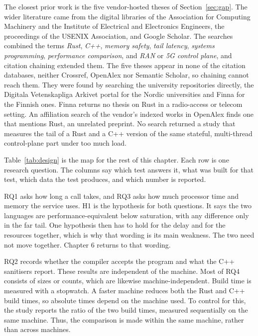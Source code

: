 \documentclass[english,oneside,a4paper,censored,csm,software-track-2020]{HYthesisML}
\begin{document}
The closest prior work is the five vendor-hosted theses of Section~\ref{sec:gap}.
The wider literature came from the digital libraries of the Association for Computing
Machinery and the Institute of Electrical and Electronics Engineers, the proceedings of the
USENIX Association, and Google Scholar. The searches combined the terms \emph{Rust},
\emph{C++}, \emph{memory safety}, \emph{tail latency}, \emph{systems programming},
\emph{performance comparison}, and \emph{RAN} or \emph{5G control plane}, and citation
chaining extended them. The five theses appear in none of the citation databases, neither
Crossref, OpenAlex nor Semantic Scholar, so chaining cannot reach them. They were found by
searching the university repositories directly, the Digitala Vetenskapliga Arkivet portal for
the Nordic universities and Finna for the Finnish ones. Finna returns no thesis on Rust in
a radio-access or telecom setting. An affiliation search of the vendor's indexed works in
OpenAlex finds one that mentions Rust, an unrelated preprint. No search returned a study
that measures the tail of a Rust and a C++ version of the same stateful, multi-thread
control-plane part under too much load.

Table~\ref{tab:design} is the map for the rest of this chapter. Each row is one research question.
The columns say which test answers it, what was built for that test, which data the test
produces, and which number is reported.

RQ1 asks how long a call takes, and RQ3 asks how much processor time and memory
the service uses. H1 is the hypothesis for
both questions. It says the two languages are performance-equivalent below
saturation, with any difference only in the far tail. One hypothesis then has
to hold for the delay and for the resources together, which is why that wording
is its main weakness. The two need not move together. Chapter 6 returns to that wording.

RQ2 records whether the compiler accepts the program and what the C++ sanitisers report. 
These results are independent of the machine. Most of RQ4 consists of sizes or counts, 
which are likewise machine-independent. Build time is measured with a stopwatch. 
A faster machine reduces both the Rust and C++ build times, so absolute times depend 
on the machine used. To control for this, the study reports the ratio of the two
build times, measured sequentially on the same machine. 
Thus, the comparison is made within the same machine, rather than across machines.
\end{document}
